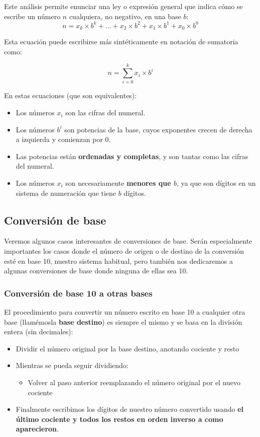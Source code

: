\documentclass[spanish,A4,]{article}
\begin{document}
Este análisis permite enunciar una ley o expresión general que indica
cómo se escribe un número $n$ cualquiera, no negativo, en una base $b$:
\[n = x_{k} \times b^k + \ldots + x_{2} \times b^{2} + x_1 \times b^1 +x_{0} \times b^0\]

Esta ecuación puede escribirse más sintéticamente en notación de
sumatoria como:

\[n = \sum_{i=0}^{k}{x_i \times b^i}\]

En estas ecuaciones (que son equivalentes):

\begin{itemize}
\itemsep1pt\parskip0pt
\item
  Los números $x_i$ son las cifras del numeral.
\item
  Los números $b^i$ son potencias de la base, cuyos exponentes crecen de
  derecha a izquierda y comienzan por 0.
\item
  Las potencias están \textbf{ordenadas y completas}, y son tantas como
  las cifras del numeral.
\item
  Los números $x_i$ son necesariamente \textbf{menores que $b$}, ya que
  son dígitos en un sistema de numeración que tiene $b$ dígitos.
\end{itemize}

\subsection{Conversión de base}\label{conversiuxf3n-de-base}

Veremos algunos casos interesantes de conversiones de base. Serán
especialmente importantes los casos donde el número de origen o de
destino de la conversión esté en base 10, nuestro sistema habitual, pero
también nos dedicaremos a algunas conversiones de base donde ninguna de
ellas sea 10.

\subsubsection{Conversión de base 10 a otras
bases}\label{conversiuxf3n-de-base-10-a-otras-bases}

El procedimiento para convertir un número escrito en base 10 a cualquier
otra base (llamémosla \textbf{base destino}) es siempre el mismo y se
basa en la división entera (sin decimales):

\begin{itemize}
\itemsep1pt\parskip0pt
\item
  Dividir el número original por la base destino, anotando cociente y
  resto
\item
  Mientras se pueda seguir dividiendo:

  \begin{itemize}
  \itemsep1pt\parskip0pt
  \item
    Volver al paso anterior reemplazando el número original por el nuevo
    cociente
  \end{itemize}
\item
  Finalmente escribimos los dígitos de nuestro número convertido usando
  \textbf{el último cociente y todos los restos en orden inverso a como
  aparecieron}.
\end{itemize}
\end{document}
